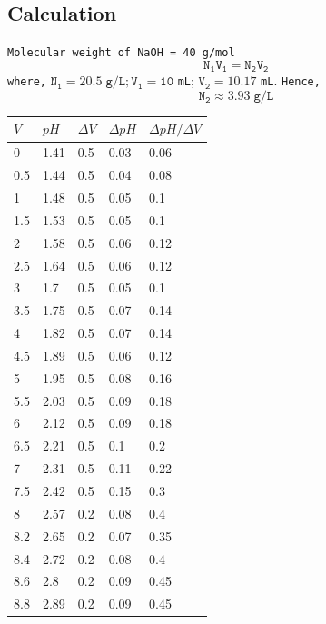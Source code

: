 \documentclass[11pt, a4paper, abstract=true]{scrartcl}
\begin{document}
\subsection*{Calculation}

\texttt{Molecular weight of NaOH = 40 g/mol} \[\mathtt{N_1 V_1 = N_2 V_2}\] \texttt{where,} \(\mathtt{N_1 = 20.5 \; g/L; V_1 = 10}\) \texttt{mL}; \(\mathtt{V_2 = 10.17}\) \texttt{mL}. \texttt{Hence,} \[\mathtt{N_2 \approx 3.93 \; g/L}\]


{\centering
    \begin{longtable}{|l|l|l|l|l|}
    \hline
    \(V\)      & \(pH\)      &   \(\Delta V\)   & \(\Delta pH\)     &  \(\Delta pH / \Delta V\)    \\ \hline
    0     & 1.41  & 0.5  & 0.03 & 0.06 \\ \hline
    0.5   & 1.44  & 0.5  & 0.04 & 0.08 \\ \hline
    1     & 1.48  & 0.5  & 0.05 & 0.1  \\ \hline
    1.5   & 1.53  & 0.5  & 0.05 & 0.1  \\ \hline
    2     & 1.58  & 0.5  & 0.06 & 0.12 \\ \hline
    2.5   & 1.64  & 0.5  & 0.06 & 0.12 \\ \hline
    3     & 1.7   & 0.5  & 0.05 & 0.1  \\ \hline
    3.5   & 1.75  & 0.5  & 0.07 & 0.14 \\ \hline
    4     & 1.82  & 0.5  & 0.07 & 0.14 \\ \hline
    4.5   & 1.89  & 0.5  & 0.06 & 0.12 \\ \hline
    5     & 1.95  & 0.5  & 0.08 & 0.16 \\ \hline
    5.5   & 2.03  & 0.5  & 0.09 & 0.18 \\ \hline
    6     & 2.12  & 0.5  & 0.09 & 0.18 \\ \hline
    6.5   & 2.21  & 0.5  & 0.1  & 0.2  \\ \hline
    7     & 2.31  & 0.5  & 0.11 & 0.22 \\ \hline
    7.5   & 2.42  & 0.5  & 0.15 & 0.3  \\ \hline
    8     & 2.57  & 0.2  & 0.08 & 0.4  \\ \hline
    8.2   & 2.65  & 0.2  & 0.07 & 0.35 \\ \hline
    8.4   & 2.72  & 0.2  & 0.08 & 0.4  \\ \hline
    8.6   & 2.8   & 0.2  & 0.09 & 0.45 \\ \hline
    8.8   & 2.89  & 0.2  & 0.09 & 0.45 \\ \hline

\end{longtable}}
\end{document}
